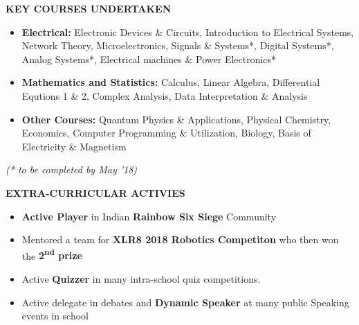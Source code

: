 \documentclass[11pt]{article}%
\begin{document}
\begin{flushleft}
\bf{\LARGE{K}\Large{EY} \LARGE{C}\Large{OURSES} \LARGE{U}\Large{NDERTAKEN}}
\end{flushleft}
\vspace{-7mm}
\hrulefill
\vspace{-3mm}
\begin{itemize}
\setlength\itemsep{0.01em}
\item \textbf{Electrical:} \nohyphens{Electronic Devices \& Circuits, Introduction to Electrical Systems, Network Theory, Microelectronics, Signals \& Systems*, Digital Systems*, Analog Systems*, Electrical machines \& Power Electronics*}
\vspace{-1.2mm}
\item \textbf{Mathematics and Statistics:} \nohyphens{Calculus, Linear Algebra, Differential Equtions 1 \& 2, Complex Analysis, Data Interpretation \& Analysis}
\vspace{-1.2mm}
\item \textbf{Other Courses:} \nohyphens{Quantum Physics \& Applications, Physical Chemistry, Economics, Computer Programming \& Utilization, Biology, Basis of Electricity \& Magnetism}
\end{itemize}
\vspace{-4mm}
\hfill {{{\em{(* to be completed by May '18)}}}}
\begin{flushleft}
\bf{\LARGE{E}\Large{XTRA-}\LARGE{C}\Large{URRICULAR} \LARGE{A}\Large{CTIVIES}}
\end{flushleft}
\vspace{-6mm}
\hrulefill
\vspace{-1mm}
\begin{itemize}
    \vspace{-2mm}
    \item {\bf Active Player} in Indian {\bf Rainbow Six Siege}  Community
    \vspace{-3mm}
    \item Mentored a team for {\bf XLR8 2018 Robotics Competiton} who then won the {\bf 2\textsuperscript{nd} prize} 
    \vspace{-3mm}
    \item Active {\bf Quizzer} in many intra-school quiz competitions.
    \vspace{-3mm}
    \item Active delegate in debates and \textbf{Dynamic Speaker} at many public Speaking events in school
\end{itemize}
\end{document}
